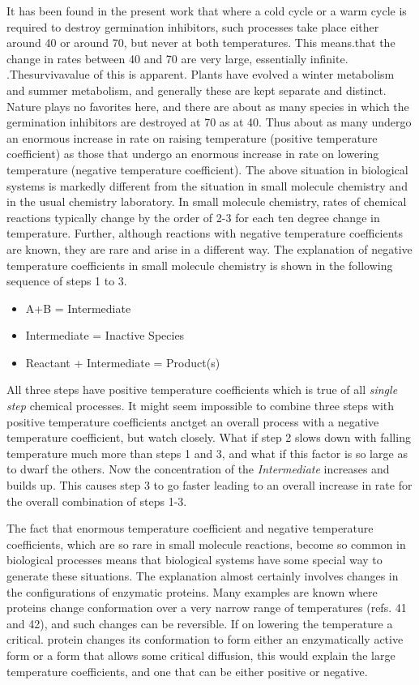 It has been found in the present work that where a cold cycle or a warm cycle is
required to destroy germination inhibitors, such processes take place either around 40
or around 70, but never at both temperatures. This means.that the change in rates
between 40 and 70 are very large, essentially infinite. .Thesurvivavalue of this is
apparent. Plants have evolved a winter metabolism and summer metabolism, and
generally these are kept separate and distinct. Nature plays no favorites here, and
there are about as many species in which the germination inhibitors are destroyed at
70 as at 40. Thus about as many undergo an enormous increase in rate on raising
temperature (positive temperature coefficient) as those that undergo an enormous
increase in rate on lowering temperature (negative temperature coefficient).
The above situation in biological systems is markedly different from the
situation in small molecule chemistry and in the usual chemistry laboratory. In small
molecule chemistry, rates of chemical reactions typically change by the order of 2-3 for
each ten degree change in temperature. Further, although reactions with negative
temperature coefficients are known, they are rare and arise in a different way. The
explanation of negative temperature coefficients in small molecule chemistry is shown
in the following sequence of steps 1 to 3.

\begin{itemize}
\item A+B = Intermediate
\item Intermediate = Inactive Species
\item Reactant + Intermediate = Product(s)
\end{itemize}

All three steps have positive temperature coefficients which is true of all \textit{single
step} chemical processes. It might seem impossible to combine three steps with
positive temperature coefficients anctget an overall process with a negative
temperature coefficient, but watch closely. What if step 2 slows down with falling
temperature much more than steps 1 and 3, and what if this factor is so large as to
dwarf the others. Now the concentration of the \textit{Intermediate} increases and builds up.
This causes step 3 to go faster leading to an overall increase in rate for the overall
combination of steps 1-3.

The fact that enormous temperature coefficient and negative temperature
coefficients, which are so rare in small molecule reactions, become so common in
biological processes means that biological systems have some special way to
generate these situations. The explanation almost certainly involves changes in the
configurations of enzymatic proteins. Many examples are known where proteins
change conformation over a very narrow range of temperatures (refs. 41 and 42), and
such changes can be reversible. If on lowering the temperature a critical. protein
changes its conformation to form either an enzymatically active form or a form that
allows some critical diffusion, this would explain the large temperature coefficients,
and one that can be either positive or negative.

